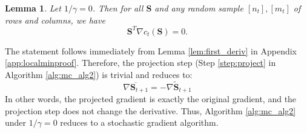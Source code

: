 \documentclass[twoside,11pt]{article}
\newtheorem{lem}{Lemma}
\begin{document}
\begin{lem}
	Let $1/\gamma=0$. Then for all $\bm{S}$ and any random sample $[n_t],[m_t]$ of rows and columns, we have
	\[\bm{S}^T\nabla c_t(\bm{S})=0.\]
\end{lem}
The statement follows immediately from Lemma \ref{lem:first_deriv} in Appendix \ref{app:localminproof}. Therefore, the projection step (Step \ref{step:project} in Algorithm \ref{alg:mc_alg2}) is trivial and reduces to:
\[\overline{\nabla \bm{S}_{t+1}} = -\nabla \tilde{\bm{S}}_{t+1} \]
In other words, the projected gradient is exactly the original gradient, and the projection step does not change the derivative. Thus, Algorithm \ref{alg:mc_alg2} under $1/\gamma=0$ reduces to a stochastic gradient algorithm. 
\end{document}
